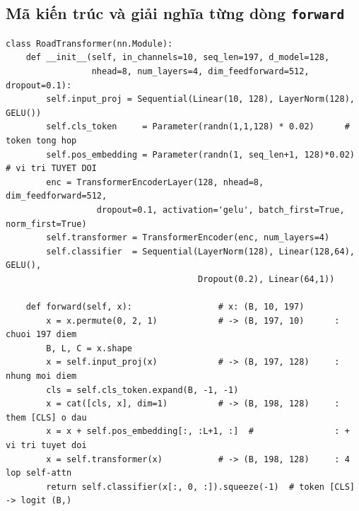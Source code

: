 \documentclass[11pt]{article}
\newcommand{\code}[1]{\textcolor{cInk}{\texttt{#1}}}
\theoremstyle{definition}
\begin{document}
\subsection{Mã kiến trúc và giải nghĩa từng dòng \code{forward}}
\begin{lstlisting}
class RoadTransformer(nn.Module):
    def __init__(self, in_channels=10, seq_len=197, d_model=128,
                 nhead=8, num_layers=4, dim_feedforward=512, dropout=0.1):
        self.input_proj = Sequential(Linear(10, 128), LayerNorm(128), GELU())
        self.cls_token     = Parameter(randn(1,1,128) * 0.02)      # token tong hop
        self.pos_embedding = Parameter(randn(1, seq_len+1, 128)*0.02)  # vi tri TUYET DOI
        enc = TransformerEncoderLayer(128, nhead=8, dim_feedforward=512,
                  dropout=0.1, activation='gelu', batch_first=True, norm_first=True)
        self.transformer = TransformerEncoder(enc, num_layers=4)
        self.classifier  = Sequential(LayerNorm(128), Linear(128,64), GELU(),
                                      Dropout(0.2), Linear(64,1))

    def forward(self, x):                 # x: (B, 10, 197)
        x = x.permute(0, 2, 1)            # -> (B, 197, 10)      : chuoi 197 diem
        B, L, C = x.shape
        x = self.input_proj(x)            # -> (B, 197, 128)     : nhung moi diem
        cls = self.cls_token.expand(B, -1, -1)
        x = cat([cls, x], dim=1)          # -> (B, 198, 128)     : them [CLS] o dau
        x = x + self.pos_embedding[:, :L+1, :]  #                : + vi tri tuyet doi
        x = self.transformer(x)           # -> (B, 198, 128)     : 4 lop self-attn
        return self.classifier(x[:, 0, :]).squeeze(-1)  # token [CLS] -> logit (B,)
\end{lstlisting}
\end{document}
